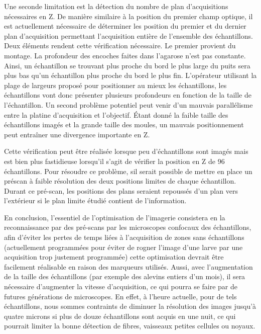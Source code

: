 \documentclass[\main/main.tex]{subfiles}
\begin{document}
%
Une seconde limitation est la détection du nombre de plan d'acquisitions nécessaires en Z.
%
De manière similaire à la position du premier champ optique,
il est actuellement nécessaire de déterminer les position du premier et du dernier plan d'acquisition permettant l'acquisition entière de l'ensemble des échantillons.
%
Deux éléments rendent cette vérification nécessaire.
%
Le premier provient du montage.
%
La profondeur des encoches faites dans l'agarose n'est pas constante.
%
Ainsi, un échantillon se trouvant plus proche du bord le plus large du puits sera plus bas qu'un échantillon plus proche du bord le plus fin.
%
L'opérateur utilisant la plage de largeurs proposé pour positionner au mieux les échantillons,
les échantillons vont donc présenter plusieurs profondeurs en fonction de la taille de l'échantillon.
%
Un second problème potentiel peut venir d'un mauvais parallélisme entre la platine d'acquisition et l'objectif.
%
Étant donné la faible taille des échantillons imagés et la grande taille des moules, un mauvais positionnement peut entraîner une divergence importante en Z.
%

Cette vérification peut être réalisée lorsque peu d'échantillons sont imagés mais est bien plus fastidieuse lorsqu'il s'agit de vérifier la position en Z de 96 échantillons.
%
Pour résoudre ce problème, sil serait possible de mettre en place un préscan à faible résolution des deux positions limites de chaque échantillon.
%
Durant ce pré-scan, les positions des plans seraient repoussés d'un plan vers l'extérieur si le plan limite étudié contient de l'information.

En conclusion, l'essentiel de l'optimisation de l'imagerie consistera en la reconnaissance par des pré-scans par les microscopes confocaux des échantillons, afin d'éviter les pertes de temps liées à l'acquisition de zones sans échantillons (actuellement programmées pour éviter de rogner l'image d'une larve par une acquisition trop justement programmée) cette optimisation devrait être facilement réalisable en raison des marqueurs utilisés. Aussi, avec l'augmentation de la taille des échantillons (par exemple des alevins entiers d'un mois), il sera nécessaire d'augmenter la vitesse d'acquisition, ce qui pourra se faire par de futures générations de microscopes. En effet, à l'heure actuelle, pour de tels échantillons, nous sommes contraints de diminuer la résolution des images jusqu'à quatre microns si plus de douze échantillons sont acquis en une nuit, ce qui pourrait limiter la bonne détection de fibres, vaisseaux petites cellules ou noyaux.
\end{document}
